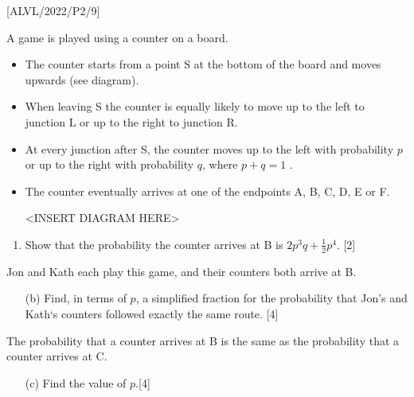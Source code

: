 \item {[}ALVL/2022/P2/9{]}

A game is played using a counter on a board.
\begin{itemize}
\item The counter starts from a point S at the bottom of the board and moves
upwards (see diagram).
\item When leaving S the counter is equally likely to move up to the left
to junction L or up to the right to junction R.
\item At every junction after S, the counter moves up to the left with probability
$p$ or up to the right with probability $q$, where $p+q=1$ . 
\item The counter eventually arrives at one of the endpoints A, B, C, D,
E or F. 
\noindent \begin{center}
<INSERT DIAGRAM HERE>
\par\end{center}
\end{itemize}
\begin{enumerate}
\item Show that the probability the counter arrives at B is $2p^{3}q+\frac{1}{2}p^{4}$.
\hfill{}{[}2{]}
\end{enumerate}
Jon and Kath each play this game, and their counters both arrive at
B. 
\begin{enumerate}
\item[(b)]   Find, in terms of $p$, a simplified fraction for the probability
that Jon's and Kath\textquoteleft s counters followed exactly the
same route.\hfill{} {[}4{]}
\end{enumerate}
The probability that a counter arrives at B is the same as the probability
that a counter arrives at C.
\begin{enumerate}
\item[(c)]  Find the value of $p$.\hfill{}{[}4{]}
\end{enumerate}
